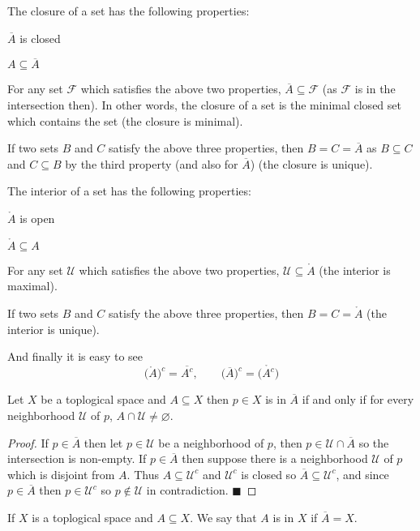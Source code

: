 \documentclass[10pt]{article}
\def\qed{\hskip1cm\penalty-100\hbox{}\hfill$\blacksquare$}
\def\mU{\mathcal{U}}
\def\mF{\mathcal{F}}
\begin{document}
The closure of a set has the following properties:
\benum
    \item $\overline A$ is closed
    \item $A\subseteq\overline A$
    \item For any set $\mF$ which satisfies the above two properties, $\overline A\subseteq\mF$ (as $\mF$ is in the intersection then).
    In other words, the closure of a set is the minimal closed set which contains the set (the closure is minimal).
    \item If two sets $B$ and $C$ satisfy the above three properties, then $B=C=\overline A$ as $B\subseteq C$ and $C\subseteq B$ by the third property (and also for $\overline A$) (the closure is unique).
\eenum

The interior of a set has the following properties:
\benum
    \item $\mathring A$ is open
    \item $\mathring A\subseteq A$
    \item For any set $\mU$ which satisfies the above two properties, $\mU\subseteq\mathring A$ (the interior is maximal).
    \item If two sets $B$ and $C$ satisfy the above three properties, then $B=C=\mathring A$ (the interior is unique).
\eenum

And finally it is easy to see
\[ \bigl(\mathring A\bigr)^c = \overline{A^c},\qquad \bigl(\overline A\bigr)^c = \mathring{\bigl(A^c\bigr)} \]

\begin{prop*}

    Let $X$ be a toplogical space and $A\subseteq X$ then $p\in X$ is in $\overline A$ if and only if for every neighborhood $\mU$ of $p$, $A\cap\mU\neq\varnothing$.

\end{prop*}

\begin{proof}

    If $p\in\overline A$ then let $p\in\mU$ be a neighborhood of $p$, then $p\in\mU\cap\overline A$ so the intersection is non-empty.
    If $p\in\overline A$ then suppose there is a neighborhood $\mU$ of $p$ which is disjoint from $A$.
    Thus $A\subseteq\mU^c$ and $\mU^c$ is closed so $\overline A\subseteq\mU^c$, and since $p\in\overline A$ then $p\in\mU^c$ so $p\notin\mU$ in contradiction.
    \qed

\end{proof}

\begin{defn*}

    If $X$ is a toplogical space and $A\subseteq X$.
    We say that $A$ is  in $X$ if $\overline A=X$.

\end{defn*}
\end{document}
